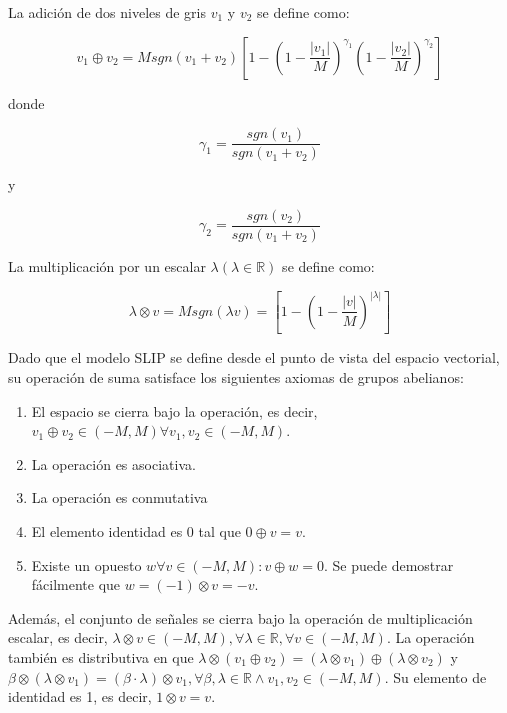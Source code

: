 La adición de dos niveles de gris $v_1$ y $v_2$ se define como:

\begin{equation}
	v_1\oplus v_2=Msgn(v_1+v_2)\left[1-\left(1-\frac{|v_1|}{M}\right)^{\gamma_1}\left(1-\frac{|v_2|}{M}\right)^{\gamma_2}\right]
\end{equation}

donde

\begin{equation}
	\gamma_1=\frac{sgn(v_1)}{sgn(v_1+v_2)}
\end{equation}

y

\begin{equation}
	\gamma_2=\frac{sgn(v_2)}{sgn(v_1+v_2)}
\end{equation}

La multiplicación por un escalar $\lambda (\lambda \in \mathbb{R})$ se define como:

\begin{equation}
	\lambda \otimes v = Msgn(\lambda v)=\left[1-\left(1-\frac{|v|}{M}\right)^{|\lambda|}\right]
\end{equation}

Dado que el modelo SLIP se define desde el punto de vista del espacio vectorial, su operación de suma satisface los siguientes axiomas de grupos abelianos:

\begin{enumerate}
	\item El espacio se cierra bajo la operación, es decir, $v_1\oplus v_2 \in (-M, M ) \forall v_1, v_2 \in (-M, M )$.
	\item La operación es asociativa.
	\item La operación es conmutativa
	\item El elemento identidad es $0$ tal que $0\oplus v = v$.
	\item  Existe un opuesto $w \forall v \in (-M, M ): v \oplus w = 0$.  Se puede demostrar fácilmente que $w = (-1)\otimes v = -v $.
\end{enumerate}
  
Además, el conjunto de señales se cierra bajo la operación de multiplicación escalar, es decir, $\lambda \otimes v \in (-M, M), \forall \lambda \in \mathbb{R}, \forall v \in (-M, M)$. La operación también es distributiva en que $\lambda \otimes (v_1\oplus v_2) = (\lambda \otimes v_1 )\oplus (\lambda\otimes v_2)$ y $\beta\otimes (\lambda\otimes v_1 ) = (\beta \cdot \lambda)\otimes v_1, \forall \beta, \lambda \in \mathbb{R} \land v_1 , v_2 \in (-M, M)$. Su elemento de identidad es 1, es decir, $1\otimes v = v $.

